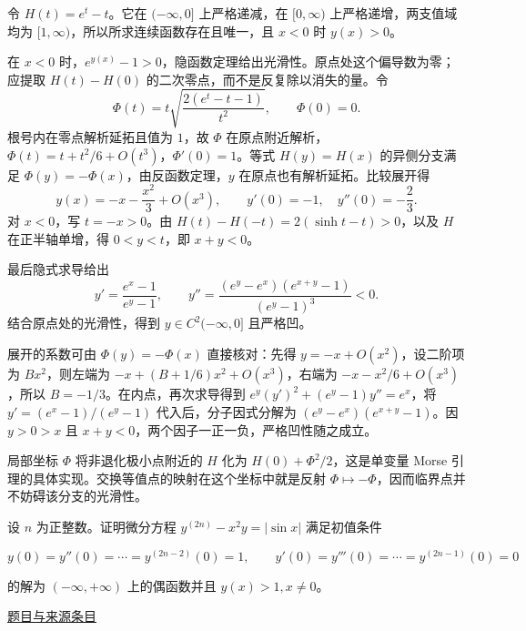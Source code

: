 \documentclass[12pt,fontset=fandol]{ctexart}
\begin{document}
\begin{solve}\label{ans:fin13-low:9}

令 $H(t)=e^t-t$。它在 $(-\infty,0]$ 上严格递减，在 $[0,\infty)$ 上严格递增，两支值域均为 $[1,\infty)$，所以所求连续函数存在且唯一，且 $x<0$ 时 $y(x)>0$。

在 $x<0$ 时，$e^{y(x)}-1>0$，隐函数定理给出光滑性。原点处这个偏导数为零；应提取 $H(t)-H(0)$ 的二次零点，而不是反复除以消失的量。令
\[
\Phi(t)=t\sqrt{\frac{2(e^t-t-1)}{t^2}},\qquad \Phi(0)=0.
\]
根号内在零点解析延拓且值为 $1$，故 $\Phi$ 在原点附近解析，$\Phi(t)=t+t^2/6+O(t^3)$，$\Phi'(0)=1$。等式 $H(y)=H(x)$ 的异侧分支满足 $\Phi(y)=-\Phi(x)$，由反函数定理，$y$ 在原点也有解析延拓。比较展开得
\[
y(x)=-x-\frac{x^2}{3}+O(x^3),
\qquad y'(0)=-1,\quad y''(0)=-\frac23.
\]
对 $x<0$，写 $t=-x>0$。由 $H(t)-H(-t)=2(\sinh t-t)>0$，以及 $H$ 在正半轴单增，得 $0<y<t$，即 $x+y<0$。

最后隐式求导给出
\[
y'=\frac{e^x-1}{e^y-1},\qquad
 y''=\frac{(e^y-e^x)(e^{x+y}-1)}{(e^y-1)^3}<0.
\]
结合原点处的光滑性，得到 $y\in C^2(-\infty,0]$ 且严格凹。

展开的系数可由 $\Phi(y)=-\Phi(x)$ 直接核对：先得 $y=-x+O(x^2)$，设二阶项为 $Bx^2$，则左端为 $-x+(B+1/6)x^2+O(x^3)$，右端为 $-x-x^2/6+O(x^3)$，所以 $B=-1/3$。在内点，再次求导得到 $e^y(y')^2+(e^y-1)y''=e^x$，将 $y'=(e^x-1)/(e^y-1)$ 代入后，分子因式分解为 $(e^y-e^x)(e^{x+y}-1)$。因 $y>0>x$ 且 $x+y<0$，两个因子一正一负，严格凹性随之成立。

\end{solve}

\begin{remark}[方法与条件]局部坐标 $\Phi$ 将非退化极小点附近的 $H$ 化为 $H(0)+\Phi^2/2$，这是单变量 Morse 引理的具体实现。交换等值点的映射在这个坐标中就是反射 $\Phi\mapsto-\Phi$，因而临界点并不妨碍该分支的光滑性。\end{remark}

\begin{example}\label{ex:fin13-low:10}\label{pr:fin13-low:10}

设 $n$ 为正整数。证明微分方程 $y^{(2n)} - x^{2} y = |\sin x|$ 满足初值条件

\[
y(0) = y''(0) = \cdots = y^{(2n-2)}(0) = 1, \qquad y'(0) = y'''(0) = \cdots = y^{(2n-1)}(0) = 0
\]

的解为 $(-\infty, +\infty)$ 上的偶函数并且 $y(x) > 1, x \neq 0$。

\par\href{https://github.com/lzxcr/cmc-mathematics/blob/64916fa1fdbc3e444a652eca204d5669058ee321/src/problems/finals/13/12.md}{题目与来源条目}

\end{example}
\end{document}
